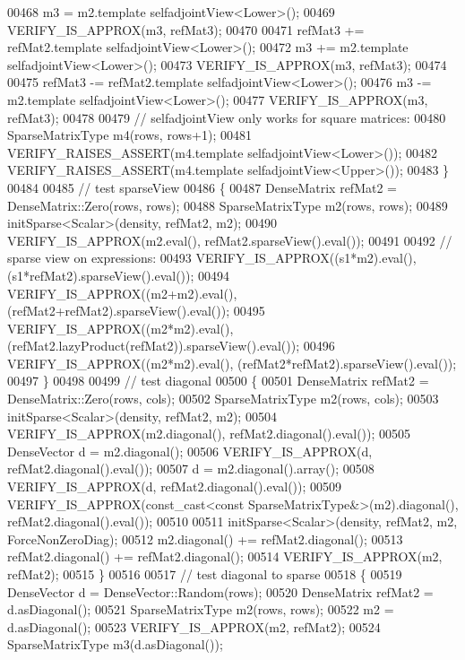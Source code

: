 \begin{DoxyCode}
00468     m3 = m2.template selfadjointView<Lower>();
00469     VERIFY\_IS\_APPROX(m3, refMat3);
00470 
00471     refMat3 += refMat2.template selfadjointView<Lower>();
00472     m3 += m2.template selfadjointView<Lower>();
00473     VERIFY\_IS\_APPROX(m3, refMat3);
00474 
00475     refMat3 -= refMat2.template selfadjointView<Lower>();
00476     m3 -= m2.template selfadjointView<Lower>();
00477     VERIFY\_IS\_APPROX(m3, refMat3);
00478 
00479     \textcolor{comment}{// selfadjointView only works for square matrices:}
00480     SparseMatrixType m4(rows, rows+1);
00481     VERIFY\_RAISES\_ASSERT(m4.template selfadjointView<Lower>());
00482     VERIFY\_RAISES\_ASSERT(m4.template selfadjointView<Upper>());
00483   \}
00484   
00485   \textcolor{comment}{// test sparseView}
00486   \{
00487     DenseMatrix refMat2 = DenseMatrix::Zero(rows, rows);
00488     SparseMatrixType m2(rows, rows);
00489     initSparse<Scalar>(density, refMat2, m2);
00490     VERIFY\_IS\_APPROX(m2.eval(), refMat2.sparseView().eval());
00491 
00492     \textcolor{comment}{// sparse view on expressions:}
00493     VERIFY\_IS\_APPROX((s1*m2).eval(), (s1*refMat2).sparseView().eval());
00494     VERIFY\_IS\_APPROX((m2+m2).eval(), (refMat2+refMat2).sparseView().eval());
00495     VERIFY\_IS\_APPROX((m2*m2).eval(), (refMat2.lazyProduct(refMat2)).sparseView().eval());
00496     VERIFY\_IS\_APPROX((m2*m2).eval(), (refMat2*refMat2).sparseView().eval());
00497   \}
00498 
00499   \textcolor{comment}{// test diagonal}
00500   \{
00501     DenseMatrix refMat2 = DenseMatrix::Zero(rows, cols);
00502     SparseMatrixType m2(rows, cols);
00503     initSparse<Scalar>(density, refMat2, m2);
00504     VERIFY\_IS\_APPROX(m2.diagonal(), refMat2.diagonal().eval());
00505     DenseVector d = m2.diagonal();
00506     VERIFY\_IS\_APPROX(d, refMat2.diagonal().eval());
00507     d = m2.diagonal().array();
00508     VERIFY\_IS\_APPROX(d, refMat2.diagonal().eval());
00509     VERIFY\_IS\_APPROX(const\_cast<const SparseMatrixType&>(m2).diagonal(), refMat2.diagonal().eval());
00510     
00511     initSparse<Scalar>(density, refMat2, m2, ForceNonZeroDiag);
00512     m2.diagonal()      += refMat2.diagonal();
00513     refMat2.diagonal() += refMat2.diagonal();
00514     VERIFY\_IS\_APPROX(m2, refMat2);
00515   \}
00516   
00517   \textcolor{comment}{// test diagonal to sparse}
00518   \{
00519     DenseVector d = DenseVector::Random(rows);
00520     DenseMatrix refMat2 = d.asDiagonal();
00521     SparseMatrixType m2(rows, rows);
00522     m2 = d.asDiagonal();
00523     VERIFY\_IS\_APPROX(m2, refMat2);
00524     SparseMatrixType m3(d.asDiagonal());

\end{DoxyCode}
